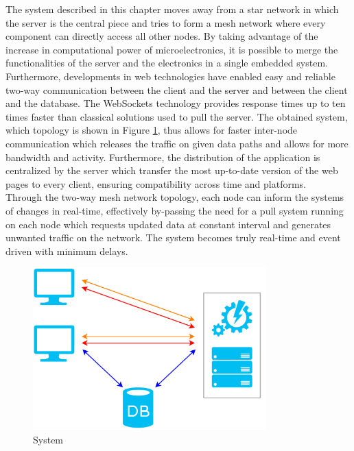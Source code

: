     The system described in this chapter moves away from a star network in which the server is the central piece and tries to form a mesh network where every component can directly access all other nodes. By taking advantage of the increase in computational power of microelectronics, it is possible to merge the functionalities of the server and the electronics in a single embedded system. Furthermore, developments in web technologies have enabled easy and reliable two-way communication between the client and the server and between the client and the database. The WebSockets technology provides response times up to ten times faster than classical solutions used to pull the server. The obtained system, which topology is shown in Figure \ref{fig:III-2-system-new}, thus allows for faster inter-node communication which releases the traffic on given data paths and allows for more bandwidth and activity. Furthermore, the distribution of the application is centralized by the server which transfer the most up-to-date version of the web pages to every client, ensuring compatibility across time and platforms. \\

    Through the two-way mesh network topology, each node can inform the systems of changes in real-time, effectively by-passing the need for a pull system running on each node which requests updated data at constant interval and generates unwanted traffic on the network. The system becomes truly real-time and event driven with minimum delays.

    \begin{figure}[h!]
      \centering
      \includegraphics[width=0.8\textwidth]{img/III-2-web-daq/new-sys.png}
      \caption{System}
      \label{fig:III-2-system-new}
    \end{figure}

